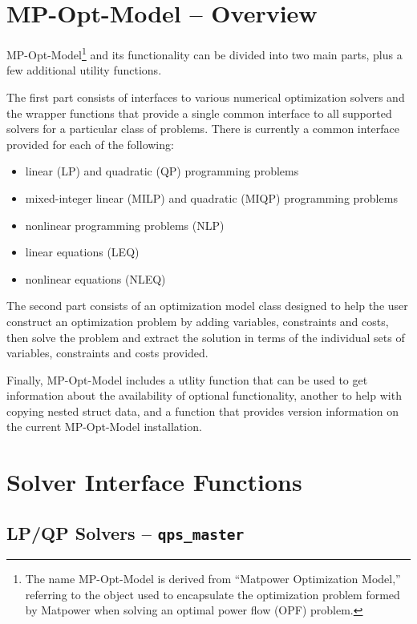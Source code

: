\documentclass[12pt]{article}
\newcommand{\matpower}[0]{{\sc Matpower}}
\newcommand{\mpom}[0]{\mbox{MP-Opt-Model}}
\numberwithin{equation}{section}
\numberwithin{table}{section}
\numberwithin{figure}{section}
\begin{document}
\clearpage
\section{\mpom{} -- Overview}
\label{sec:mpom}

\mpom{}\footnote{The name \mpom{} is derived from ``\matpower{} Optimization Model,'' referring to the object used to encapsulate the optimization problem formed by \matpower{} when solving an optimal power flow (OPF) problem.} and its functionality can be divided into two main parts, plus a few additional utility functions.

The first part consists of interfaces to various numerical optimization solvers and the wrapper functions that provide a single common interface to all supported solvers for a particular class of problems. There is currently a common interface provided for each of the following:
\begin{itemize}
\item linear (LP) and quadratic (QP) programming problems
\item mixed-integer linear (MILP) and quadratic (MIQP) programming problems
\item nonlinear programming problems (NLP)
\item linear equations (LEQ)
\item nonlinear equations (NLEQ)
\end{itemize}

The second part consists of an optimization model class designed to help the user construct an optimization problem by adding variables, constraints and costs, then solve the problem and extract the solution in terms of the individual sets of variables, constraints and costs provided.

Finally, \mpom{} includes a utlity function that can be used to get information about the availability of optional functionality, another to help with copying nested struct data, and a function that provides version information on the current \mpom{} installation.


\clearpage
\section{Solver Interface Functions}
\label{sec:master_solvers}

\subsection{LP/QP Solvers -- {\tt qps\_master}}
\label{sec:qps_master}
\end{document}
